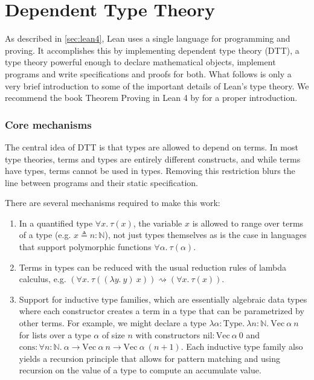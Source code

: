 \section{Dependent Type Theory}\label{sec:dtt}
As described in \cref{sec:lean4}, Lean uses a single language for programming and proving. It accomplishes this by implementing dependent type theory (DTT), a type theory powerful enough to declare mathematical objects, implement programs and write specifications and proofs for both. What follows is only a very brief introduction to some of the important details of Lean's type theory. We recommend the book Theorem Proving in Lean 4 by \cite{avigad_theorem_2022} for a proper introduction.

\subsubsection{Core mechanisms}
The central idea of DTT is that types are allowed to depend on terms. In most type theories, terms and types are entirely different constructs, and while terms have types, terms cannot be used in types. Removing this restriction blurs the line between programs and their static specification.

There are several mechanisms required to make this work: 
\begin{enumerate}
	\item In a quantified type $\forall x.\ \tau(x)$, the variable $x$ is allowed to range over terms of a type (e.g. $x \triangleq n : \mathbb{N}$), not just types themselves as is the case in languages that support polymorphic functions $\forall \alpha.\ \tau(\alpha)$.
	\item Terms in types can be reduced with the usual reduction rules of lambda calculus, e.g. $(\forall x.\ \tau((\lambda y.\ y)\ x)) \rightsquigarrow (\forall x.\ \tau(x))$.
	\item Support for inductive type families, which are essentially algebraic data types where each constructor creates a term in a type that can be parametrized by other terms. For example, we might declare a type $\lambda \alpha : \mathrm{Type}.\ \lambda n : \mathbb{N}.\ \mathrm{Vec}\ \alpha\ n$ for lists over a type $\alpha$ of size $n$ with constructors $\mathrm{nil} : \mathrm{Vec}\ \alpha\ 0$ and $\mathrm{cons} : \forall n : \mathbb{N}.\ \alpha \to \mathrm{Vec}\ \alpha\ n \to \mathrm{Vec}\ \alpha\ (n+1)$. Each inductive type family also yields a recursion principle that allows for pattern matching and using recursion on the value of a type to compute an accumulate value.
\end{enumerate}

